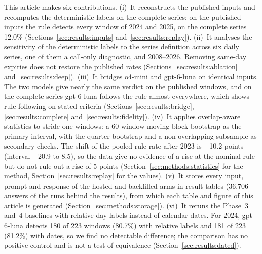 This article makes six contributions.
(i)~It reconstructs the published inputs and recomputes the deterministic labels on the complete series: on the published inputs the rule detects every window of 2024 and 2025, on the complete series 12.0\% (Sections~\ref{sec:results:inputs} and~\ref{sec:results:replay}).
(ii)~It analyses the sensitivity of the deterministic labels to the series definition across six daily series, one of them a call-only diagnostic, and 2008--2026. Removing same-day expiries does not restore the published rates (Sections~\ref{sec:results:ablation} and~\ref{sec:results:deep}).
(iii)~It bridges o4-mini and gpt-6-luna on identical inputs. The two models give nearly the same verdict on the published windows, and on the complete series gpt-6-luna follows the rule almost everywhere, which shows rule-following on stated criteria (Sections~\ref{sec:results:bridge}, \ref{sec:results:complete} and~\ref{sec:results:fidelity}).
(iv)~It applies overlap-aware statistics to stride-one windows: a 60-window moving-block bootstrap as the primary interval, with the quarter bootstrap and a non-overlapping subsample as secondary checks. The shift of the pooled rule rate after 2023 is $-$10.2 points (interval $-$20.9 to 8.5), so the data give no evidence of a rise at the nominal rule but do not rule out a rise of 5 points (Section~\ref{sec:methods:statistics} for the method, Section~\ref{sec:results:replay} for the values).
(v)~It stores every input, prompt and response of the hosted and backfilled arms in result tables (36{,}706 answers of the runs behind the results), from which each table and figure of this article is generated (Section~\ref{sec:methods:storage}).
(vi)~It reruns the Phase~3 and~4 baselines with relative day labels instead of calendar dates. For 2024, gpt-6-luna detects 180 of 223 windows (80.7\%) with relative labels and 181 of 223 (81.2\%) with dates, so we find no detectable difference; the comparison has no positive control and is not a test of equivalence (Section~\ref{sec:results:dated}).

